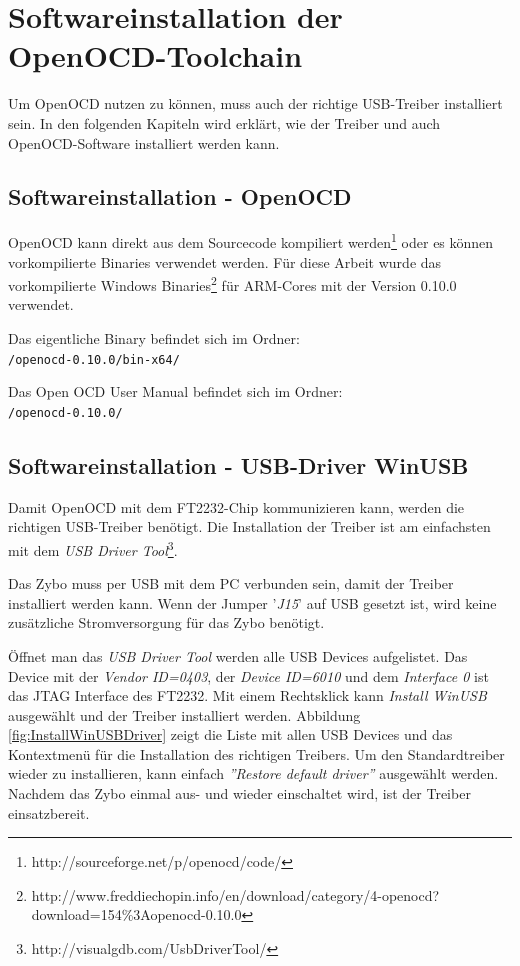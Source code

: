 \section{Softwareinstallation der OpenOCD-Toolchain}
Um OpenOCD nutzen zu können, muss auch der richtige USB-Treiber installiert sein.
In den folgenden Kapiteln wird erklärt, wie der Treiber und auch OpenOCD-Software installiert werden kann.


\subsection{Softwareinstallation - OpenOCD}
OpenOCD kann direkt aus dem Sourcecode kompiliert werden\footnote{http://sourceforge.net/p/openocd/code/} oder es können vorkompilierte Binaries verwendet werden.
Für diese Arbeit wurde das vorkompilierte Windows Binaries\footnote{http://www.freddiechopin.info/en/download/category/4-openocd?download=154\%3Aopenocd-0.10.0} für ARM-Cores mit der Version 0.10.0 verwendet.

Das eigentliche Binary befindet sich im Ordner:\\
\texttt{/openocd-0.10.0/bin-x64/} 

Das Open OCD User Manual\cite{bib:OpenOCDDoku} befindet sich im Ordner:\\
\texttt{/openocd-0.10.0/} 


\subsection{Softwareinstallation - USB-Driver WinUSB}
\label{kapitel:usbTreiber}
Damit OpenOCD mit dem FT2232-Chip kommunizieren kann, werden die richtigen USB-Treiber benötigt.
Die Installation der Treiber ist am einfachsten mit dem \textit{USB Driver Tool}\footnote{http://visualgdb.com/UsbDriverTool/}.

Das Zybo muss per USB mit dem PC verbunden sein, damit der Treiber installiert werden kann.
Wenn der Jumper '\textit{J15}' auf USB gesetzt ist, wird keine zusätzliche Stromversorgung für das Zybo benötigt.

Öffnet man das \textit{USB Driver Tool} werden alle USB Devices aufgelistet.
Das Device mit der \textit{Vendor ID=0403}, der \textit{Device ID=6010} und dem \textit{Interface 0} ist das JTAG Interface des FT2232.
Mit einem Rechtsklick kann \textit{Install WinUSB} ausgewählt und der Treiber installiert werden.
Abbildung \ref{fig:InstallWinUSBDriver} zeigt die Liste mit allen USB Devices und das Kontextmenü für die Installation des richtigen Treibers.
Um den Standardtreiber wieder zu installieren, kann einfach \textit{''Restore default driver''} ausgewählt werden.
Nachdem das Zybo einmal aus- und wieder einschaltet wird, ist der Treiber einsatzbereit.

